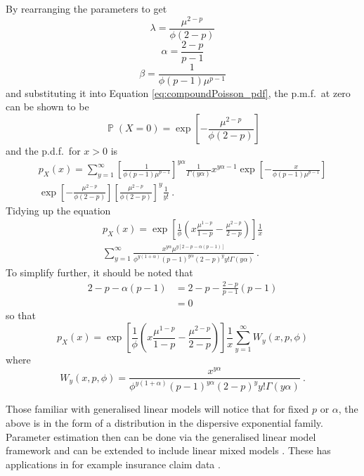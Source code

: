 \documentclass[12pt, a4paper]{memoir}
\DeclareMathOperator{\prob}{\mathbb{P}}
\begin{document}
By rearranging the parameters to get
\begin{equation}
\lambda=\frac{\mu^{2-p}}{\phi(2-p)}
\end{equation}
\begin{equation}
\alpha=\frac{2-p}{p-1}
\end{equation}
\begin{equation}
\beta=\frac{1}{\phi(p-1)\mu^{p-1}}
\end{equation}
and substituting it into Equation \eqref{eq:compoundPoisson_pdf}, the p.m.f.~at zero can be shown to be
\begin{equation}
\prob(X=0) = \exp\left[
-\frac{\mu^{2-p}}{\phi(2-p)}
\right]
\end{equation}
and the p.d.f.~for $x>0$ is
\begin{multline*}
p_X(x) = \sum_{y=1}^{\infty}
\left[\frac{1}{\phi(p-1)\mu^{p-1}}\right]^{y\alpha}
\frac{1}{\Gamma(y\alpha)}
x^{y\alpha-1}
\exp\left[-\frac{x}{\phi(p-1)\mu^{p-1}}\right]
\\
\exp\left[-\frac{\mu^{2-p}}{\phi(2-p)}\right]
\left[\frac{\mu^{2-p}}{\phi(2-p)}\right]^y
\frac{1}{y!} \ .
\end{multline*}
Tidying up the equation
\begin{multline*}
p_X(x) = 
\exp\left[\frac{1}{\phi}\left(x\frac{\mu^{1-p}}{1-p}-\frac{\mu^{2-p}}{2-p}\right)\right]\frac{1}{x}
\\
\sum_{y=1}^{\infty}\frac{x^{y\alpha}\mu^{y[2-p-\alpha(p-1)]}}{\phi^{y(1+\alpha)}(p-1)^{y\alpha}(2-p)^yy!\Gamma(y\alpha)} \ .
\end{multline*}
To simplify further, it should be noted that
\begin{align*}
2-p-\alpha(p-1) &= 2-p - \frac{2-p}{p-1}(p-1)
\\&=0
\end{align*}
so that
\begin{equation}
p_X(x) = 
\exp\left[\frac{1}{\phi}\left(x\frac{\mu^{1-p}}{1-p}-\frac{\mu^{2-p}}{2-p}\right)\right]\frac{1}{x}
\sum_{y=1}^{\infty}W_y(x,p,\phi)
\end{equation}
where
\begin{equation}
W_y(x,p,\phi)=\frac{x^{y\alpha}}{\phi^{y(1+\alpha)}(p-1)^{y\alpha}(2-p)^yy!\Gamma(y\alpha)} \ .
\end{equation}

Those familiar with generalised linear models \citep{nelder1972generalized} \citep{mccullagh1984generalized} will notice that for fixed $p$ or $\alpha$, the above is in the form of a distribution in the dispersive exponential family. Parameter estimation then can be done via the generalised linear model framework and can be extended to include linear mixed models \citep{zhang2013likelihood}. These has applications in for example insurance claim data \citep{jorgensen1994fitting} \citep{smyth2002fitting}.
\end{document}
